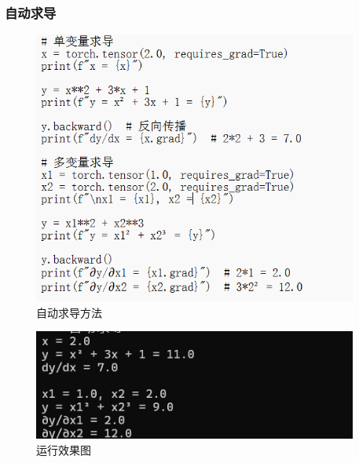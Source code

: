 \documentclass[UTF8]{ctexart}
\begin{document}
\subsubsection{自动求导}
\begin{figure}[H]
    \centering
    \includegraphics[width=0.95\textwidth]{picture/自动求导示例.png}%
    \caption{自动求导方法}
\end{figure}
\begin{figure}[H]
    \centering
    \includegraphics[width=0.95\textwidth]{picture/自动求导.png}%
    \caption{运行效果图}
\end{figure}
\end{document}
